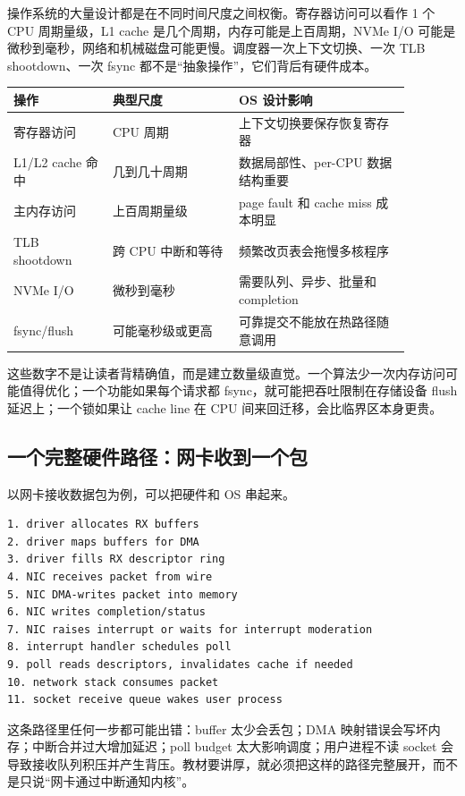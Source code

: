 操作系统的大量设计都是在不同时间尺度之间权衡。寄存器访问可以看作 1 个 CPU 周期量级，L1 cache 是几个周期，内存可能是上百周期，NVMe I/O 可能是微秒到毫秒，网络和机械磁盘可能更慢。调度器一次上下文切换、一次 TLB shootdown、一次 fsync 都不是“抽象操作”，它们背后有硬件成本。

\begin{longtable}{p{0.22\linewidth}p{0.28\linewidth}p{0.38\linewidth}}
\toprule
操作 & 典型尺度 & OS 设计影响 \\
\midrule
寄存器访问 & CPU 周期 & 上下文切换要保存恢复寄存器 \\
L1/L2 cache 命中 & 几到几十周期 & 数据局部性、per-CPU 数据结构重要 \\
主内存访问 & 上百周期量级 & page fault 和 cache miss 成本明显 \\
TLB shootdown & 跨 CPU 中断和等待 & 频繁改页表会拖慢多核程序 \\
NVMe I/O & 微秒到毫秒 & 需要队列、异步、批量和 completion \\
fsync/flush & 可能毫秒级或更高 & 可靠提交不能放在热路径随意调用 \\
\bottomrule
\end{longtable}

这些数字不是让读者背精确值，而是建立数量级直觉。一个算法少一次内存访问可能值得优化；一个功能如果每个请求都 fsync，就可能把吞吐限制在存储设备 flush 延迟上；一个锁如果让 cache line 在 CPU 间来回迁移，会比临界区本身更贵。

\subsection{一个完整硬件路径：网卡收到一个包}

以网卡接收数据包为例，可以把硬件和 OS 串起来。

\begin{lstlisting}
1. driver allocates RX buffers
2. driver maps buffers for DMA
3. driver fills RX descriptor ring
4. NIC receives packet from wire
5. NIC DMA-writes packet into memory
6. NIC writes completion/status
7. NIC raises interrupt or waits for interrupt moderation
8. interrupt handler schedules poll
9. poll reads descriptors, invalidates cache if needed
10. network stack consumes packet
11. socket receive queue wakes user process
\end{lstlisting}

这条路径里任何一步都可能出错：buffer 太少会丢包；DMA 映射错误会写坏内存；中断合并过大增加延迟；poll budget 太大影响调度；用户进程不读 socket 会导致接收队列积压并产生背压。教材要讲厚，就必须把这样的路径完整展开，而不是只说“网卡通过中断通知内核”。

